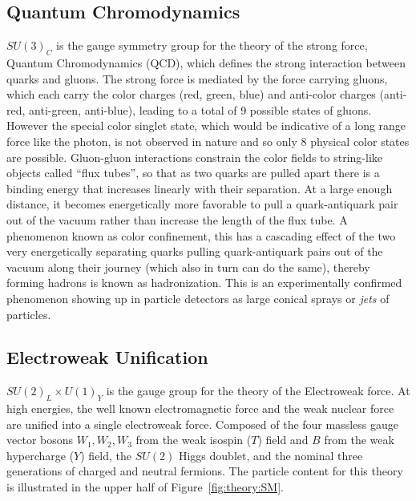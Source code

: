 \subsection{Quantum Chromodynamics}\label{sec:theory:QCD}
$SU(3)_{C}$ is the gauge symmetry group for the theory of the strong force, Quantum Chromodynamics (QCD), which defines the strong interaction between quarks and gluons.
The strong force is mediated by the force carrying gluons, which each carry the color charges (red, green, blue) and anti-color charges (anti-red, anti-green, anti-blue), leading to a total of 9 possible states of gluons.
However the special color singlet state, which would be indicative of a long range force like the photon, is not observed in nature and so only 8 physical color states are possible.
Gluon-gluon interactions constrain the color fields to string-like objects called ``flux tubes'', so that as two quarks are pulled apart there is a binding energy that increases linearly with their separation.
At a large enough distance, it becomes energetically more favorable to pull a quark-antiquark pair out of the vacuum rather than increase the length of the flux tube.
A phenomenon known as color confinement, this has a cascading effect of the two very energetically separating quarks pulling quark-antiquark pairs out of the vacuum along their journey (which also in turn can do the same), thereby forming hadrons is known as hadronization.
This is an experimentally confirmed phenomenon showing up in particle detectors as large conical sprays or \emph{jets} of particles.

\subsection{Electroweak Unification}\label{sec:theory:ewkuni}
$SU(2)_{L}\times U(1)_{Y}$ is the gauge group for the theory of the Electroweak force.
At high energies, the well known electromagnetic force and the weak nuclear force are unified into a single electroweak force.
Composed of the four massless gauge vector bosons $W_{1},W_{2}, W_{3} $ from the weak isospin ($T$) field and $B$ from the weak hypercharge ($Y$) field, the $SU(2)$ Higgs doublet, and the nominal three generations of charged and neutral fermions.
The particle content for this theory is illustrated in the upper half of Figure~\ref{fig:theory:SM}.

